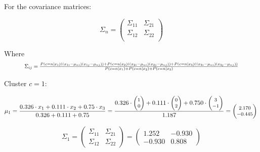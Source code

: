 \documentclass[12pt]{article}
\begin{document}
\begin{enumerate}
        \vspace{10pt}
        For the covariance matrices:

        \begin{equation}\label{covariance_matrix}
            \Sigma_n = \begin{pmatrix}
                \Sigma_{11} & \Sigma_{21} \\
                \Sigma_{12} & \Sigma_{22} \\
            \end{pmatrix}
        \end{equation}
        
        Where
        \begin{equation*}
            \resizebox{0.88\hsize}{!}{$
            \Sigma_{ij} = \frac{
              P(c=n|x_1)\left(\left(x_{1i} - \mu_{ni}\right) \left(x_{1j}- \mu_{nj}\right)\right) 
            + P(c=n|x_2)\left(\left(x_{2i} - \mu_{ni}\right) \left(x_{2j}- \mu_{nj}\right)\right) 
            + P(c=n|x_3)\left(\left(x_{3i} - \mu_{ni}\right) \left(x_{3j}- \mu_{nj}\right)\right)
            }{P(c=n|x_1) + P(c=n|x_2) + P(c=n|x_3)}
            $}
        \end{equation*}
        
        \newpage
         Cluster $c=1$:

        \begin{equation*}
            \fontsize{8pt}{10pt}\selectfont
            \mu_1 = \frac{0.326 \cdot x_1 + 0.111 \cdot x_2 + 0.75 \cdot x_3}{0.326+0.111+0.75} = \frac{0.326 \cdot \begin{pmatrix}
            1\\
            0
            \end{pmatrix}+ 0.111 \cdot \begin{pmatrix}
            0\\
            2
            \end{pmatrix} + 0.750 \cdot \begin{pmatrix}
            3\\
            -1
            \end{pmatrix}}{1.187} = \begin{pmatrix}
            2.170\\
            -0.445
            \end{pmatrix}\\
        \end{equation*}

        \begin{equation*}
            \Sigma_1 = \begin{pmatrix}
                \Sigma_{11} & \Sigma_{21} \\
                \Sigma_{12} & \Sigma_{22}
            \end{pmatrix} = \begin{pmatrix}
                1.252 & -0.930\\
                -0.930 & 0.808
            \end{pmatrix}
        \end{equation*}


\end{enumerate}
\end{document}
